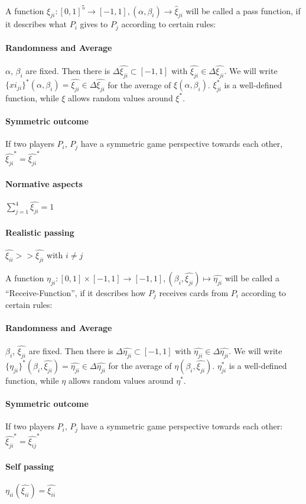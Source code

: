 \begin{definition}
A function $\xi_{ji} : [0,1]^5 \to [-1,1], (\alpha, \beta_i) \to \hat{\xi}_{ji}$ will be called a pass function, if it describes what $P_i$ gives to $P_j$ according to certain rules:
\paragraph{Randomness and Average}
$\alpha$, $\beta_i$ are fixed. Then there is $\Delta  \hat{\xi_{ji}} \subset [-1,1]$ with  $\hat{\xi_{ji}} \in \Delta  \hat{\xi_{ji}}$. We will write $\{xi_{ji}\}^* (\alpha, \beta_i) =  \hat{\xi_{ji}} \in \Delta  \hat{\xi_{ji}}$ for the average of $\xi(\alpha, \beta_i)$. $\xi_{ji}^*$ is a well-defined function, while $\xi$ allows random values around $\xi^*$.
\paragraph{Symmetric outcome}
If two players $P_i$, $P_j$ have a symmetric game perspective towards each other,  $\hat{\xi_{ji}}^* =  \hat{\xi_{ji}}^*$
\paragraph{Normative aspects}
$\sum_{j = 1}^4 \hat{\xi_{ji}} = 1$
\paragraph{Realistic passing}
$\hat{\xi_{ii}} >>  \hat{\xi_{ji}}$ with $ i \neq j $
\end{definition}
\begin{definition}
A function $\eta_{ji}: [0,1] \times [-1,1] \to [-1,1], (\beta_i,  \hat{\xi_{ji}}) \mapsto \hat{\eta_{ji}}$ will be
called a “Receive-Function”, if it describes how $P_j$ receives cards from $P_i$ according to certain rules:
\paragraph{Randomness and Average}
$\beta_i$, $\hat{\xi_{ji}}$ are fixed. Then there is $\Delta  \hat{\eta_{ji}} \subset [-1,1]$ with  $\hat{\eta_{ji}} \in \Delta  \hat{\eta_{ji}}$. We will write $\{\eta_{ji}\}^* (\beta_i, \hat{\xi_{ji}}) =  \hat{\eta_{ji}} \in \Delta  \hat{\eta_{ji}}$ for the average of $\eta(\beta_i, \hat{\xi_{ji}})$. $\eta_{ji}^*$ is a well-defined function, while $\eta$ allows random values around $\eta^*$.
\paragraph{Symmetric outcome}
If two players $P_i$, $P_j$ have a symmetric game perspective towards each other:  $\hat{\xi_{ji}}^* =  \hat{\xi_{ij}}^*$
\paragraph{Self passing}
$\eta_{ii}(\hat{\xi_{ii}}) = \hat{\xi_{ii}} $
\end{definition}
